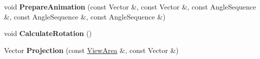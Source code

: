 \begin{DoxyCompactItemize}
\item 
void {\bfseries Prepare\+Animation} (const Vector \&, const Vector \&, const Angle\+Sequence \&, const Angle\+Sequence \&, const Angle\+Sequence \&)\hypertarget{classRadar_1_1PlaneDisplay_a28e85973a080831e719f254e678a955c}{}\label{classRadar_1_1PlaneDisplay_a28e85973a080831e719f254e678a955c}

\item 
void {\bfseries Calculate\+Rotation} ()\hypertarget{classRadar_1_1PlaneDisplay_a7e61f4de46bb424122348e54059ed989}{}\label{classRadar_1_1PlaneDisplay_a7e61f4de46bb424122348e54059ed989}

\item 
Vector {\bfseries Projection} (const \hyperlink{structRadar_1_1ViewArea}{View\+Area} \&, const Vector \&)\hypertarget{classRadar_1_1PlaneDisplay_a6f4a75491c23484b6ecc2ebab98d3593}{}\label{classRadar_1_1PlaneDisplay_a6f4a75491c23484b6ecc2ebab98d3593}

\end{DoxyCompactItemize}
